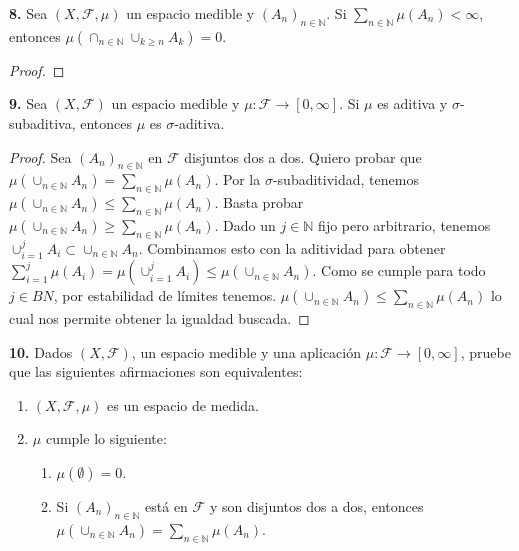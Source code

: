 \documentclass{article}
\newenvironment{statement}[1]{\smallskip\noindent\color[rgb]{1.00,0.00,0.50} {\bf #1.}}{}
\theoremstyle{definition}
\theoremstyle{remark}
\newcommand{\BN}{\mathbb N}
\begin{document}
\begin{statement}{8}
  Sea $(X, \mathcal{F}, \mu)$ un espacio medible y $(A_n)_{n \in \BN}$. Si $\sum_{n \in \BN} \mu(A_n) < \infty$, entonces $\mu(\cap_{n \in \BN} \cup_{k \geq n} A_k) = 0$.
\end{statement}

\begin{proof}
\end{proof}

\begin{statement}{9}
  Sea $(X, \mathcal{F})$ un espacio medible y $\mu: \mathcal{F} \to [0, \infty]$. Si $\mu$ es aditiva y $\sigma$-subaditiva, entonces $\mu$ es $\sigma$-aditiva.
\end{statement}

\begin{proof}
  Sea $(A_n)_{n \in \BN}$ en $\mathcal{F}$ disjuntos dos a dos. Quiero probar que $\mu(\cup_{n \in \BN} A_n) = \sum_{n \in \BN} \mu(A_n)$.
  Por la $\sigma$-subaditividad, tenemos $\mu(\cup_{n \in \BN} A_n) \leq \sum_{n \in \BN} \mu(A_n)$.
  Basta probar $\mu(\cup_{n \in \BN} A_n) \geq \sum_{n \in \BN} \mu(A_n)$.
  Dado un $j \in \BN$ fijo pero arbitrario, tenemos $\cup_{i = 1}^j A_i \subset \cup_{n \in \BN} A_n$.
  Combinamos esto con la aditividad para obtener
  $\sum_{i = 1}^j \mu(A_i) = \mu(\cup_{i = 1}^j A_i) \leq \mu(\cup_{n \in \BN} A_n)$.
  Como se cumple para todo $j \in BN$, por estabilidad de l\'imites tenemos.
  $\mu(\cup_{n \in \BN} A_n) \leq \sum_{n \in \BN} \mu(A_n)$ lo cual nos permite obtener la igualdad buscada.
\end{proof}

\begin{statement}{10}
  Dados $(X, \mathcal{F})$, un espacio medible y una aplicaci\'on $\mu: \mathcal{F} \to [0, \infty]$, pruebe que las siguientes afirmaciones son equivalentes:
  \begin{enumerate}
    \item $(X, \mathcal{F}, \mu)$ es un espacio de medida.
    \item $\mu$ cumple lo siguiente:
      \begin{enumerate}
        \item $\mu(\emptyset) = 0$.
        \item Si $(A_n)_{n \in \BN}$ est\'a en $\mathcal{F}$ y son disjuntos dos a dos, entonces $\mu(\cup_{n \in \BN} A_n) = \sum_{n \in \BN} \mu(A_n)$.
      \end{enumerate}
  \end{enumerate}
\end{statement}
\end{document}
